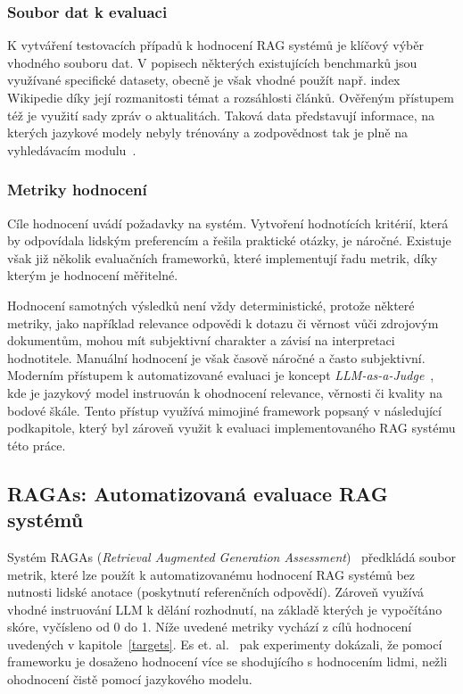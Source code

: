 \subsubsection{Soubor dat k evaluaci}
K vytváření testovacích případů k hodnocení RAG systémů je klíčový výběr vhodného souboru dat. V popisech některých existujících benchmarků jsou využívané specifické datasety, obecně je však vhodné použít např. index Wikipedie díky její rozmanitosti témat a rozsáhlosti článků. Ověřeným přístupem též je využití sady zpráv o aktualitách. Taková data představují informace, na kterých jazykové modely nebyly trénovány a zodpovědnost tak je plně na vyhledávacím modulu~\cite{yu2025evaluationrag}.

\subsubsection{Metriky hodnocení}
Cíle hodnocení uvádí požadavky na systém. Vytvoření hodnotících kritérií, která by odpovídala lidským preferencím a řešila praktické otázky, je náročné. Existuje však již několik evaluačních frameworků, které implementují řadu metrik, díky kterým je hodnocení měřitelné.

Hodnocení samotných výsledků není vždy deterministické, protože některé metriky, jako například relevance odpovědi k dotazu či věrnost vůči zdrojovým dokumentům, mohou mít subjektivní charakter a závisí na interpretaci hodnotitele. Manuální hodnocení je však časově náročné a často subjektivní. Moderním přístupem k automatizované evaluaci je koncept \textit{LLM-as-a-Judge}~\cite{gu2025surveyllmasajudge, li2024llmsasjudgescomprehensivesurveyllmbased}, kde je jazykový model instruován k ohodnocení relevance, věrnosti či kvality na bodové škále. Tento přístup využívá mimojiné framework popsaný v následující podkapitole, který byl zároveň využit k evaluaci implementovaného RAG systému této práce. 

\subsection{RAGAs: Automatizovaná evaluace RAG systémů}
\label{ragastheory}
Systém RAGAs (\textit{Retrieval Augmented Generation Assessment})~\cite{es2023ragasautomatedevaluationretrieval} předkládá soubor metrik, které lze použít k automatizovanému hodnocení RAG systémů bez nutnosti lidské anotace (poskytnutí referenčních odpovědí). Zároveň využívá vhodné instruování LLM k dělání rozhodnutí, na základě kterých je vypočítáno skóre, vyčísleno od 0 do 1. Níže uvedené metriky vychází z cílů hodnocení uvedených v kapitole~\ref{targets}. Es et. al.~\cite{es2023ragasautomatedevaluationretrieval} pak experimenty dokázali, že pomocí frameworku je dosaženo hodnocení více se shodujícího s hodnocením lidmi, nežli ohodnocení čistě pomocí jazykového modelu.

